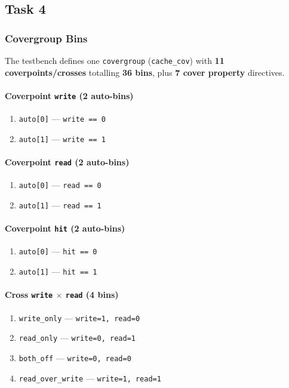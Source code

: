 \documentclass[11pt]{article}
\begin{document}
\subsection*{Task 4}

\subsubsection*{Covergroup Bins}

The testbench defines one \texttt{covergroup} (\texttt{cache\_cov}) with \textbf{11 coverpoints/crosses} totalling \textbf{36 bins}, plus \textbf{7 cover property} directives.

\paragraph*{Coverpoint \texttt{write} (2 auto-bins)}
\begin{enumerate}[label=\arabic*.]
  \item \texttt{auto[0]} --- \texttt{write == 0}
  \item \texttt{auto[1]} --- \texttt{write == 1}
\end{enumerate}

\paragraph*{Coverpoint \texttt{read} (2 auto-bins)}
\begin{enumerate}[resume, label=\arabic*.]
  \item \texttt{auto[0]} --- \texttt{read == 0}
  \item \texttt{auto[1]} --- \texttt{read == 1}
\end{enumerate}

\paragraph*{Coverpoint \texttt{hit} (2 auto-bins)}
\begin{enumerate}[resume, label=\arabic*.]
  \item \texttt{auto[0]} --- \texttt{hit == 0}
  \item \texttt{auto[1]} --- \texttt{hit == 1}
\end{enumerate}

\paragraph*{Cross \texttt{write} $\times$ \texttt{read} (4 bins)}
\begin{enumerate}[resume, label=\arabic*.]
  \item \texttt{write\_only} --- \texttt{write=1, read=0}
  \item \texttt{read\_only} --- \texttt{write=0, read=1}
  \item \texttt{both\_off} --- \texttt{write=0, read=0}
  \item \texttt{read\_over\_write} --- \texttt{write=1, read=1}
\end{enumerate}
\end{document}
